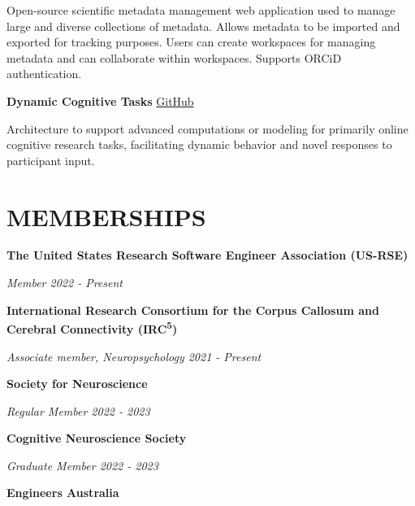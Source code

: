 \documentclass{article}
\begin{document}
  Open-source scientific metadata management web application used to manage large and diverse collections of metadata. Allows metadata to be imported and exported for tracking purposes. Users can create workspaces for managing metadata and can collaborate within workspaces. Supports ORCiD authentication.

  \begin{comment}
  \textit{Tools: React, TypeScript, Webpack, Node.js, GraphQL, Express.js, MongoDB, Docker}
  \end{comment}

  \smallbreak

  \textbf{Dynamic Cognitive Tasks} \hfill \href{https://github.com/Brain-Development-and-Disorders-Lab/task_template_dynamic}{GitHub}

  Architecture to support advanced computations or modeling for primarily online cognitive research tasks, facilitating dynamic behavior and novel responses to participant input.

  \begin{comment}
  \textit{Tools: Docker, R, MATLAB}
  \end{comment}

  \section*{\centering\uppercase{Memberships}}

  {\textbf{The United States Research Software Engineer Association (US-RSE)}}

  \textit{Member \hfill 2022 - Present}

  \smallbreak

  {\textbf{International Research Consortium for the Corpus Callosum and Cerebral Connectivity (IRC\textsuperscript{5})}}

  \textit{Associate member, Neuropsychology \hfill 2021 - Present}

  \smallbreak

  {\textbf{Society for Neuroscience}}

  \textit{Regular Member \hfill 2022 - 2023}

  \smallbreak

  {\textbf{Cognitive Neuroscience Society}}

  \textit{Graduate Member \hfill 2022 - 2023}

  \smallbreak

  {\textbf{Engineers Australia}}
\end{document}
